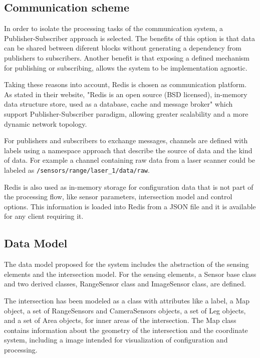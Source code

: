 \subsection{Communication scheme}

In order to isolate the processing tasks of the communication system, a Publisher-Subscriber approach is selected. The benefits of this option is that data can be shared between diferent blocks without generating a dependency from publishers to subscribers. Another benefit is that exposing a defined mechanism for publishing or subscribing, allows the system to be implementation agnostic.

Taking these reasons into account, Redis is chosen as communication platform. As stated in their website, "Redis is an open source (BSD licensed), in-memory data structure store, used as a database, cache and message broker"\cite{Redis} which support Publisher-Subscriber paradigm, allowing greater scalability and a more dynamic network topology.

For publishers and subscribers to exchange messages, channels are defined with labels using a namespace approach that describe the source of data and the kind of data. For example a channel containing raw data from a laser scanner could be labeled as \texttt{/sensors/range/laser\_1/data/raw}.

Redis is also used as in-memory storage for configuration data that is not part of the processing flow, like sensor parameters, intersection model and control options. This information is loaded into Redis from a JSON file and it is available for any client requiring it.


\subsection{Data Model}

The data model proposed for the system includes the abstraction of the sensing elements and the intersection model. For the sensing elements, a Sensor base class and two derived classes, RangeSensor class and ImageSensor class, are defined. 

The intersection has been modeled as a class with attributes like a label, a Map object, a set of RangeSensors and CameraSensors objects, a set of Leg objects, and a set of Area objects, for inner areas of the intersection. The Map class contains information about the geometry of the intersection and the coordinate system, including a image intended for visualization of configuration and processing.

